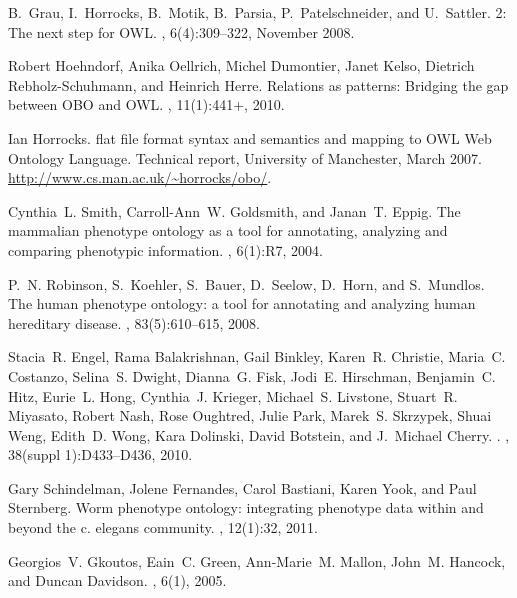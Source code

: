 \documentclass[11pt]{article}
\begin{document}
\begin{thebibliography}{10}
B.~Grau, I.~Horrocks, B.~Motik, B.~Parsia, P.~Patelschneider, and U.~Sattler.
 2: The next step for {OWL}.
, 6(4):309--322, November 2008.

Robert Hoehndorf, Anika Oellrich, Michel Dumontier, Janet Kelso, Dietrich
  Rebholz-Schuhmann, and Heinrich Herre.
\newblock Relations as patterns: Bridging the gap between {OBO} and {OWL}.
, 11(1):441+, 2010.

Ian Horrocks.
 flat file format syntax and semantics and mapping to {OWL}
  {W}eb {O}ntology {L}anguage.
\newblock Technical report, University of Manchester, March 2007.
\newblock \url{http://www.cs.man.ac.uk/~horrocks/obo/}.

Cynthia~L. Smith, Carroll-Ann~W. Goldsmith, and Janan~T. Eppig.
\newblock The mammalian phenotype ontology as a tool for annotating, analyzing
  and comparing phenotypic information.
, 6(1):R7, 2004.

P.~N. Robinson, S.~Koehler, S.~Bauer, D.~Seelow, D.~Horn, and S.~Mundlos.
\newblock The human phenotype ontology: a tool for annotating and analyzing
  human hereditary disease.
, 83(5):610--615, 2008.

Stacia~R. Engel, Rama Balakrishnan, Gail Binkley, Karen~R. Christie, Maria~C.
  Costanzo, Selina~S. Dwight, Dianna~G. Fisk, Jodi~E. Hirschman, Benjamin~C.
  Hitz, Eurie~L. Hong, Cynthia~J. Krieger, Michael~S. Livstone, Stuart~R.
  Miyasato, Robert Nash, Rose Oughtred, Julie Park, Marek~S. Skrzypek, Shuai
  Weng, Edith~D. Wong, Kara Dolinski, David Botstein, and J.~Michael Cherry.
.
, 38(suppl 1):D433--D436, 2010.

Gary Schindelman, Jolene Fernandes, Carol Bastiani, Karen Yook, and Paul
  Sternberg.
\newblock Worm phenotype ontology: integrating phenotype data within and beyond
  the c. elegans community.
, 12(1):32, 2011.

Georgios~V. Gkoutos, Eain~C. Green, Ann-Marie~M. Mallon, John~M. Hancock, and
  Duncan Davidson.
, 6(1), 2005.


\end{thebibliography}
\end{document}
